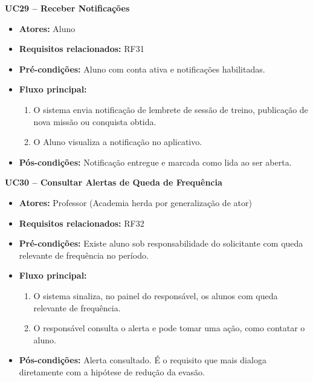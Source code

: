 \noindent\textbf{UC29 -- Receber Notificações}
\begin{itemize}[leftmargin=*, itemsep=0pt, topsep=2pt]
  \item \textbf{Atores:} Aluno
  \item \textbf{Requisitos relacionados:} RF31
  \item \textbf{Pré-condições:} Aluno com conta ativa e notificações habilitadas.
  \item \textbf{Fluxo principal:}
  \begin{enumerate}[label=\arabic*., itemsep=0pt, topsep=0pt]
    \item O sistema envia notificação de lembrete de sessão de treino, publicação de nova missão ou conquista obtida.
    \item O Aluno visualiza a notificação no aplicativo.
  \end{enumerate}
  \item \textbf{Pós-condições:} Notificação entregue e marcada como lida ao ser aberta.
\end{itemize}
\medskip

\noindent\textbf{UC30 -- Consultar Alertas de Queda de Frequência}
\begin{itemize}[leftmargin=*, itemsep=0pt, topsep=2pt]
  \item \textbf{Atores:} Professor (Academia herda por generalização de ator)
  \item \textbf{Requisitos relacionados:} RF32
  \item \textbf{Pré-condições:} Existe aluno sob responsabilidade do solicitante com queda relevante de frequência no período.
  \item \textbf{Fluxo principal:}
  \begin{enumerate}[label=\arabic*., itemsep=0pt, topsep=0pt]
    \item O sistema sinaliza, no painel do responsável, os alunos com queda relevante de frequência.
    \item O responsável consulta o alerta e pode tomar uma ação, como contatar o aluno.
  \end{enumerate}
  \item \textbf{Pós-condições:} Alerta consultado. É o requisito que mais dialoga diretamente com a hipótese de redução da evasão.
\end{itemize}
\medskip

